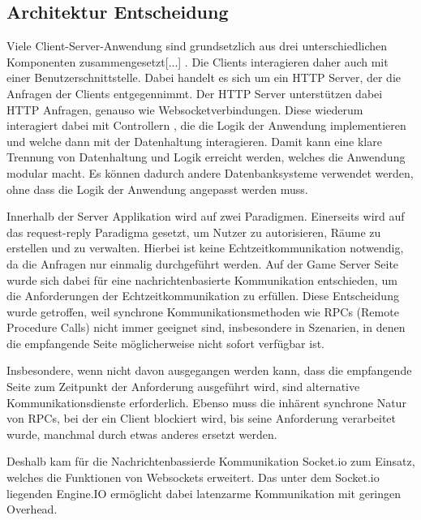 \documentclass[
]{article}
\begin{document}
\hypertarget{section-achitactural-decision}{
\subsection{Architektur Entscheidung}}

\glqq Viele Client-Server-Anwendung sind grundsetzlich aus drei unterschiedlichen Komponenten zusammengesetzt[...]\grqq{} \cite[S.57 ff.]{tanenbaum2007distributed}.
Die Clients interagieren daher auch mit einer Benutzerschnittstelle. Dabei handelt es sich um ein HTTP Server, der die Anfragen der Clients entgegennimmt.
Der HTTP Server unterstützen dabei HTTP Anfragen, genauso wie Websocketverbindungen.
Diese wiederum interagiert dabei mit \glqq Controllern \grqq{}, die die Logik der Anwendung implementieren und welche dann
mit der Datenhaltung interagieren. Damit kann eine klare Trennung von Datenhaltung und Logik erreicht werden, welches die Anwendung
modular macht. Es können dadurch andere Datenbanksysteme verwendet werden, ohne dass die Logik der Anwendung angepasst werden muss.

Innerhalb der Server Applikation wird auf zwei Paradigmen.
Einerseits wird auf das request-reply Paradigma gesetzt, um Nutzer zu autorisieren, Räume zu erstellen und zu verwalten.
Hierbei ist keine Echtzeitkommunikation notwendig, da die Anfragen nur einmalig durchgeführt werden.
Auf der Game Server Seite wurde sich dabei für eine nachrichtenbasierte Kommunikation entschieden, 
um die Anforderungen der Echtzeitkommunikation zu erfüllen. Diese Entscheidung wurde getroffen, 
weil synchrone Kommunikationsmethoden wie RPCs (Remote Procedure Calls) nicht immer geeignet 
sind, insbesondere in Szenarien, in denen die empfangende Seite möglicherweise nicht sofort 
verfügbar ist. 

\glqq Insbesondere, wenn nicht davon ausgegangen werden kann, 
dass die empfangende Seite zum Zeitpunkt der Anforderung ausgeführt wird, 
sind alternative Kommunikationsdienste erforderlich. 
Ebenso muss die inhärent synchrone Natur von RPCs, 
bei der ein Client blockiert wird, bis seine Anforderung verarbeitet wurde, 
manchmal durch etwas anderes ersetzt werden.\grqq{} \cite[S. 140 ff.]{tanenbaum2007distributed}

Deshalb kam für die Nachrichtenbassierde Kommunikation Socket.io zum Einsatz,
welches die Funktionen von Websockets erweitert.
Das unter dem Socket.io liegenden Engine.IO ermöglicht dabei latenzarme Kommunikation
mit geringen Overhead.\cite[]{engine-io-protocol}
\end{document}

